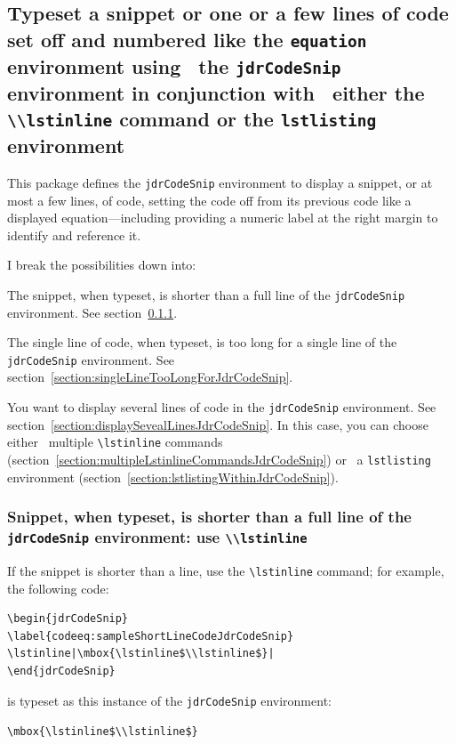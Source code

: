 \documentclass[12pt,table,final]{article}%
\begin{document}
\subsection{Typeset a snippet or one or a few lines of code set off and numbered like the \lstinline|equation| environment using ~the \lstinline|jdrCodeSnip| environment in conjunction with ~either the \lstinline|\\lstinline| command or the \lstinline|lstlisting| environment}
\label{section:typesetShortSectionJdrCodeSnip}
This package defines the \lstinline|jdrCodeSnip| environment to display a snippet, or at most a few lines, of code, setting the code off from its previous code like a displayed equation---including providing a numeric label at the right margin to identify and reference it. 

I break the possibilities down into:
\begin{jdr_itemize}
  \item The snippet, when typeset, is shorter than a full line of the \lstinline|jdrCodeSnip| environment. See section~\ref{section:snippetShorterThanALine}.
  \item The single line of code, when typeset, is too long for a single line of the \lstinline|jdrCodeSnip| environment. See section~\ref{section:singleLineTooLongForJdrCodeSnip}.
  \item You want to display several lines of code in the \lstinline|jdrCodeSnip| environment. See section~\ref{section:displaySevealLinesJdrCodeSnip}. In this case, you can choose either ~multiple \lstinline|\lstinline| commands (section~\ref{section:multipleLstinlineCommandsJdrCodeSnip}) or ~a \lstinline|lstlisting| environment (section~\ref{section:lstlistingWithinJdrCodeSnip}).
\end{jdr_itemize}

\subsubsection{Snippet, when typeset, is shorter than a full line of the \lstinline|jdrCodeSnip| environment: use \lstinline|\\lstinline|}
\label{section:snippetShorterThanALine}
If the snippet is shorter than a line, use the \lstinline|\lstinline| command; for example, the following code:
\begin{lstlisting}
\begin{jdrCodeSnip}
\label{codeeq:sampleShortLineCodeJdrCodeSnip}
\lstinline|\mbox{\lstinline$\\lstinline$}|
\end{jdrCodeSnip}
\end{lstlisting}
is typeset as this instance of the \lstinline|jdrCodeSnip| environment:
\begin{jdrCodeSnip}
\label{codeeq:sampleShortLineCodeJdrCodeSnip}
\lstinline|\mbox{\lstinline$\\lstinline$}|
\end{jdrCodeSnip}
\FloatBarrier
\end{document}
